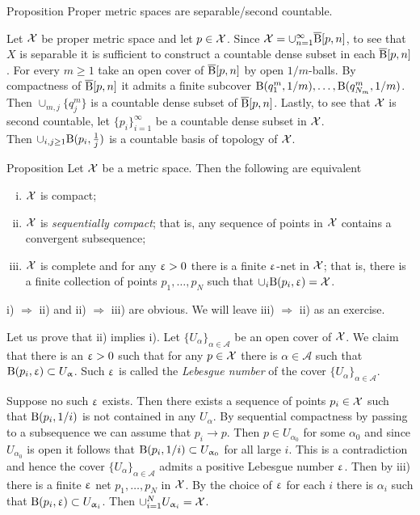 \begin{thm}{Proposition}
Proper metric spaces are separable/second countable.
\end{thm}
Let $\mathcal{X}$ be  proper metric space and let $p\in \spc{X}$.
Since $\spc{X}=\cup_{n=1}^\infty\cBall[p,n]$, to see that $X$ is separable it is sufficient to construct a countable dense subset in  each $\overline{\mathrm{B}}{}[p,n]$. 
For every $m\ge 1$  take  an open cover of $\overline{\mathrm{B}}{}[p,n]$ by open $1/m$-balls.
By compactness of $\overline{\mathrm{B}}{}[p,n]$ it admits a finite subcover $\mathrm{B}{}(q^m_1,1/m),\ldots, \mathrm{B}{}(q^m_{N_m},1/m)$. Then $\cup_{m, j} \{q^m_j\}$ is a countable dense subset of $\overline{\mathrm{B}}{}[p,n]$.
Lastly, to see that $\mathcal{X}$ is second countable, let $\{p_i\}_{i=1}^\infty$ be a countable dense subset in $\mathcal{X}$. \\ Then $\cup_{i,j\ge 1} \oBall(p_i,\frac 1 j)$ is a countable basis of topology of $\mathcal{X}$.
\qeds


\begin{thm}{Proposition}\label{compact=seq-compact}
Let $\mathcal{X}$ be a metric space. Then the following are equivalent
\begin{enumerate}[i)]
\item $\mathcal{X}$ is compact;
\item $\mathcal{X}$ is \emph{sequentially compact}; that is, any sequence of points in $\mathcal{X}$ contains a convergent subsequence;
\item $\mathcal{X}$ is complete and for any $\upvarepsilon>0$ there is a finite $\upvarepsilon$-net in $\mathcal{X}$; that is, there is a finite collection of points $p_1,\ldots,p_{N}$ such that $\cup_i\oBall(p_i,\eps)=\spc{X}$.
\end{enumerate}
\end{thm}
i) $\Rightarrow$ ii)  and ii) $\Rightarrow$  iii) are  obvious. We will leave iii) $\Rightarrow$  ii) as an exercise.

Let us prove that ii) implies i). Let $\{U_\alpha\}_{\alpha\in\mathcal A}$ be an open cover of $\mathcal{X}$. 
We claim that there is an $\upvarepsilon>0$ such that for any $p\in \spc{X}$ there is $\alpha\in\mathcal A$ such that $\oBall(p_i,\eps)\subset U_\alpha$. Such $\upvarepsilon$ is called the \emph{ Lebesgue number}  of the cover  $\{U_\alpha\}_{\alpha\in\mathcal A}$.

Suppose no such $\upvarepsilon$ exists.
Then there exists a sequence of points $p_i\in\spc{X}$ such that $\mathrm{B}{}(p_i,1/i)$ is not contained in any $U_\alpha$.
By sequential compactness by passing to a subsequence we can assume that $p_i\to p$.
Then $p\in U_{\alpha_0}$ for some $\alpha_0$ and since $U_{\alpha_0}$ is open it follows that $\oBall(p_i,1/i)\subset U_{\alpha_0}$ for all large $i$.
This is a contradiction and hence the cover $\{U_\alpha\}_{\alpha\in\mathcal A}$ admits  a positive Lebesgue number $\upvarepsilon$.
Then by iii) there is a finite $\upvarepsilon$ net $p_1,\ldots,p_{N}$ in $\mathcal{X}$. 
By the choice of $\upvarepsilon$ for each $i$ there is $\alpha_i$ such that
$\oBall(p_i,\eps)\subset U_{\alpha_i}$. 
Then $\cup_{i=1}^NU_{\alpha_i}=\spc{X}$.
\qeds 

